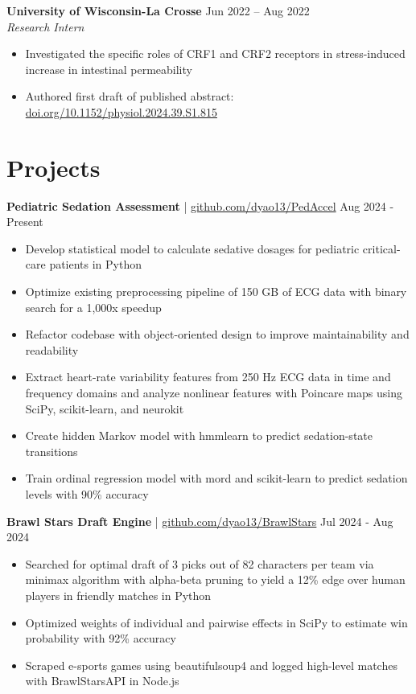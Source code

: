 \documentclass[11pt]{article}       %
\begin{document}
\textbf{University of Wisconsin-La Crosse} \hfill Jun 2022 – Aug 2022 \\
\textit{Research Intern} \vspace{-9pt} \\
\begin{itemize}
  \item Investigated the specific roles of CRF1 and CRF2 receptors in stress-induced increase in intestinal permeability
  \item Authored first draft of published abstract: \href{https://doi.org/10.1152/physiol.2024.39.S1.815}{doi.org/10.1152/physiol.2024.39.S1.815}
\end{itemize}

\vspace{-18.5pt}

\section*{Projects}
\textbf{Pediatric Sedation Assessment} | \href{https://github.com/dyao13/PedAccel}{github.com/dyao13/PedAccel} \hfill Aug 2024 - Present \vspace{-9pt} \\
\begin{itemize}
  \item Develop statistical model to calculate sedative dosages for pediatric critical-care patients in Python
  \item Optimize existing preprocessing pipeline of 150 GB of ECG data with binary search for a 1,000x speedup
  \item Refactor codebase with object-oriented design to improve maintainability and readability
  \item Extract heart-rate variability features from 250 Hz ECG data in time and frequency domains and analyze nonlinear features with Poincare maps using SciPy, scikit-learn, and neurokit
  \item Create hidden Markov model with hmmlearn to predict sedation-state transitions
  \item Train ordinal regression model with mord and scikit-learn to predict sedation levels with 90\% accuracy
\end{itemize}

\textbf{Brawl Stars Draft Engine} | \href{https://github.com/dyao13/BrawlStars}{github.com/dyao13/BrawlStars} \hfill Jul 2024 - Aug 2024 \vspace{-9pt} \\
\begin{itemize}
  \item Searched for optimal draft of 3 picks out of 82 characters per team via minimax algorithm with alpha-beta pruning to yield a 12\% edge over human players in friendly matches in Python
  \item Optimized weights of individual and pairwise effects in SciPy to estimate win probability with 92\% accuracy
  \item Scraped e-sports games using beautifulsoup4 and logged high-level matches with BrawlStarsAPI in Node.js
\end{itemize}
\end{document}
